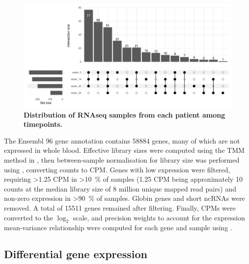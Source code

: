 \begin{figure}
    \centering
    \includegraphics[width=1.0\textwidth,page=1]{mainmatter/figures/chapter_04/process_pheno.pheno_filtered_dge.Visit_Label_upset.pdf}
    \caption[
    ]{
        \textbf{Distribution of \gls{RNAseq} samples from each patient among timepoints.}
    }
    \label{fig:multipants_visits_upset}
\end{figure}

The Ensembl 96 gene annotation contains \num{58884} genes, many of which are not expressed in whole blood.
Effective library sizes were computed using the \gls{TMM} method in  \autocite{robinson2010EdgeRBioconductorPackage},
then between-sample normalisation for library size was performed using , converting counts to \gls{CPM}.
Genes with low expression were filtered,
requiring \num{>1.25} \gls{CPM} in \SI{>10}{\percent} of samples (1.25 \gls{CPM} being approximately 10 counts at the median library size of 8 million unique mapped read pairs)
and non-zero expression in \SI{>90}{\percent} of samples.
Globin genes and short \glspl{ncRNA} were removed.
A total of \num{15511} genes remained after filtering.
Finally, \glspl{CPM} were converted to the $\log_{2}$ scale, and precision weights to account for the expression mean-variance relationship were computed for each gene and sample using  \autocite{hoffman2016VariancePartitionInterpretingDrivers}.

\subsection{Differential gene expression}

